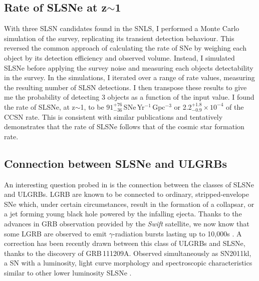 \subsection{Rate of SLSNe at z$\sim$1}
With three SLSN candidates found in the SNLS, I performed a Monte Carlo simulation of the survey, replicating its transient detection behaviour. This reversed the common approach of calculating the rate of SNe by weighing each object by its detection efficiency and observed volume. Instead, I simulated SLSNe before applying the survey noise and measuring each objects detectability in the survey. In the simulations, I iterated over a range of rate values, measuring the resulting number of SLSN detections. I then transpose these results to give me the probability of detecting 3 objects as a function of the input value. I found the rate of SLSNe, at z$\sim$1, to be $91^{+76}_{-36}$\,SNe\,Yr$^{-1}$\,Gpc$^{-3}$ or 2.2$^{+1.8}_{-0.9}\times10^{-4}$ of the CCSN rate. This is consistent with similar publications and tentatively demonstrates that the rate of SLSNe follows that of the cosmic star formation rate.

\subsection{Connection between SLSNe and ULGRBs}
An interesting question probed in \citet{Prajs2016} is the connection between the classes of SLSNe and ULGRBs. LGRB are known to be connected to ordinary, stripped-envelope SNe which, under certain circumstances, result in the formation of a collapsar, or a jet forming young black hole powered by the infalling ejecta. Thanks to the advances in GRB observation provided by the \textit{Swift} satellite, we now know that some LGRB are observed to emit $\gamma$-radiation bursts lasting up to 10,000s \citep{Levan2013a}. A correction has been recently drawn between this class of ULGRBs and SLSNe, thanks to the discovery of GRB\,111209A. Observed simultaneously as SN2011kl, a SN with a luminosity, light curve morphology and spectroscopic characteristics similar to other lower luminosity SLSNe \citep{Greiner2015}.

